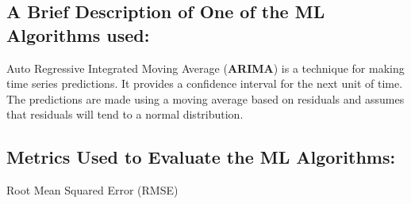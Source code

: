 \documentclass[]{article}
\begin{document}
\subsection*{A Brief Description of One of the ML Algorithms used:}
Auto Regressive Integrated Moving Average (\textbf{ARIMA}) is a technique for making time series predictions. It provides a confidence interval for the next unit of time.
The predictions are made using a moving average based on residuals and assumes that residuals will tend to a normal distribution.

\subsection*{Metrics Used to Evaluate the ML Algorithms:}
Root Mean Squared Error (RMSE)
\end{document}
